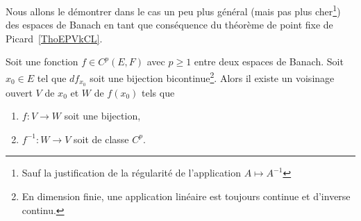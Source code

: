 Nous allons le démontrer dans le cas un peu plus général (mais pas plus cher\footnote{Sauf la justification de la régularité de l'application \( A\mapsto A^{-1}\)}) des espaces de Banach en tant que conséquence du théorème de point fixe de Picard~\ref{ThoEPVkCL}.

\begin{theorem} \label{ThoXWpzqCn}
    Soit une fonction \( f\in C^p(E,F)\) avec \( p\geq 1\) entre deux espaces de Banach. Soit \( x_0\in E\) tel que \( df_{x_0}\) soit une bijection bicontinue\footnote{En dimension finie, une application linéaire est toujours continue et d'inverse continu.}. Alors il existe un voisinage ouvert \( V\) de \( x_0\) et \( W\) de \( f(x_0)\) tels que
    \begin{enumerate}
        \item
        \( f\colon V\to W\) soit une bijection,
    \item
        \( f^{-1}\colon W\to V\) soit de classe \( C^p\).
    \end{enumerate}
\end{theorem}

